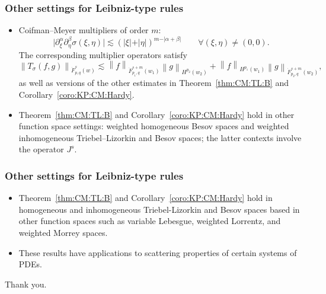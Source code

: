 \documentclass[xcolor=dvipsnames]{beamer}
\newcommand{\abs}[1]{\vert #1 \vert}
\newcommand{\norm}[2]{{\left\| #1 \right\|}_{#2}}
\newcommand{\tlw}[4]{\dot F_{#1,#3}^{#2}(#4)} %
\begin{document}
\begin{frame}\frametitle{Other settings for Leibniz-type rules}

\begin{itemize}
\item Coifman--Meyer multipliers of order $m:$
\begin{equation*}
\abs{\partial_\xi^\alpha\partial_\eta^\beta\sigma(\xi,\eta)}\lesssim (\abs{\xi}+\abs{\eta})^{m-\abs{\alpha+\beta}} \quad \quad \forall (\xi,\eta)\neq(0,0).
\end{equation*}
The corresponding multiplier operators satisfy
\begin{equation*}
\norm{T_\sigma(f,g)}{\tlw{p}{s}{q}{w}} \lesssim \norm{f}{\tlw{p_1}{s+m}{q}{w_1} } \norm{g}{H^{p_2}(w_2)} +  \norm{f}{H^{p_1}(w_1)}   \norm{g}{\tlw{p_2}{s+m}{q}{w_2} },
\end{equation*}
as well as versions of the other estimates in Theorem~\ref{thm:CM:TL:B} and Corollary~\ref{coro:KP:CM:Hardy}.

\bigskip

\item Theorem~\ref{thm:CM:TL:B} and Corollary~\ref{coro:KP:CM:Hardy} hold in other function space settings: weighted homogeneous Besov spaces and weighted inhomogeneous Triebel--Lizorkin and Besov spaces; the latter contexts involve the operator $J^s.$


\end{itemize}
\end{frame}

\begin{frame}\frametitle{Other settings for Leibniz-type rules}
\begin{itemize}


\item Theorem~\ref{thm:CM:TL:B} and Corollary~\ref{coro:KP:CM:Hardy} hold in homogeneous and inhomogeneous Triebel-Lizorkin and Besov spaces based in other function spaces such as variable Lebesgue, weighted Lorrentz, and weighted Morrey spaces. 

\bigskip

\item These results have applications to scattering properties of certain systems of PDEs. 

\end{itemize}
\end{frame}

\begin{frame}
Thank you.
\end{frame}
\end{document}
